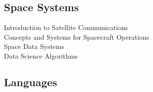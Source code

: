 \documentclass[]{deedy-resume-openfont}
\begin{document}
\begin{minipage}[t]{0.33\textwidth}
\subsection{Space Systems}
Introduction to Satellite Communications \\
Concepts and Systems for Spacecraft Operations \\
Space Data Systems \\
Data Science Algorithms
\sectionsep

\subsection{Languages}
\sectionsep

%
%

\end{minipage}
\hfill
\end{document}
